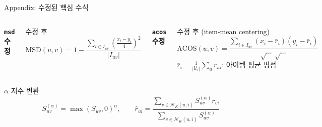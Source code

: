\documentclass[aspectratio=169,10pt]{beamer}
\begin{document}
\appendix

\begin{frame}[shrink=20]{Appendix: 수정된 핵심 수식}
	\begin{columns}[T]
			\textbf{\texttt{msd} 수정}
			\begin{exampleblock}{수정 후}
				\[ \text{MSD}(u,v) = 1 - \frac{\displaystyle\sum_{i\in I_{uv}}\!\left(\tfrac{x_i-y_i}{4}\right)^2}{|I_{uv}|} \]
			\end{exampleblock}
			\textbf{\texttt{acos} 수정}
			\begin{exampleblock}{수정 후 (item-mean centering)}
				\[ \text{ACOS}(u,v) = \frac{\displaystyle\sum_{i\in I_{uv}}(x_i-\bar{r}_i)(y_i-\bar{r}_i)}{\sqrt{\cdots}\,\sqrt{\cdots}} \]
				{\small $\bar{r}_i = \frac{1}{|\mathcal{U}_i|}\sum_u r_{ui}$: 아이템 평균 평점}
			\end{exampleblock}
	\end{columns}

	\vspace{0.5em}
	\begin{block}{$\alpha$ 지수 변환}
		\[ S_{uv}^{(\alpha)} = \max(S_{uv},0)^{\alpha}, \qquad
		   \hat{r}_{ui} = \frac{\displaystyle\sum_{v\in\mathcal{N}_K(u,i)} S_{uv}^{(\alpha)}r_{vi}}
		                       {\displaystyle\sum_{v\in\mathcal{N}_K(u,i)} S_{uv}^{(\alpha)}} \]
	\end{block}
\end{frame}
\end{document}
